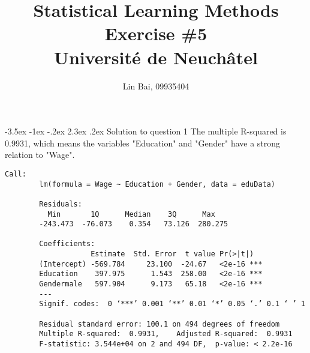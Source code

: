 \documentclass[12pt]{article}
\makeatletter
\renewcommand\section{\@startsection {section}{1}{\z@}%
	{-3.5ex \@plus -1ex \@minus -.2ex}%
	{2.3ex \@plus.2ex}%
	{\normalfont\large\bfseries}}%
\makeatother
\begin{document}
	
	
	
	\title{\textbf{Statistical Learning Methods Exercise \#{5}}\\
	Universit{\'e} de Neuch\^{a}tel}%
	\author{{Lin Bai, 09935404}} %
	
	\maketitle

	\section{Solution to question 1}
	The multiple R-squared is 0.9931, which means the variables "Education" and "Gender" have a strong relation to "Wage".\\
	
	\lstset{language=R}
	\lstset{frame=lines}
	\lstset{basicstyle=\footnotesize\ttfamily}
	\begin{lstlisting}[breaklines=true]
		Call:
		lm(formula = Wage ~ Education + Gender, data = eduData)
	 
		Residuals:
		  Min       1Q      Median    3Q      Max 
		-243.473  -76.073    0.354   73.126  280.275 
	 
		Coefficients:
		            Estimate  Std. Error  t value Pr(>|t|)    
		(Intercept) -569.784     23.100  -24.67   <2e-16 ***
		Education    397.975      1.543  258.00   <2e-16 ***
		Gendermale   597.904      9.173   65.18   <2e-16 ***
		---
		Signif. codes:  0 ‘***’ 0.001 ‘**’ 0.01 ‘*’ 0.05 ‘.’ 0.1 ‘ ’ 1
	 
		Residual standard error: 100.1 on 494 degrees of freedom
		Multiple R-squared:  0.9931,	Adjusted R-squared:  0.9931 
		F-statistic: 3.544e+04 on 2 and 494 DF,  p-value: < 2.2e-16
	\end{lstlisting}
	\newpage
\end{document}
